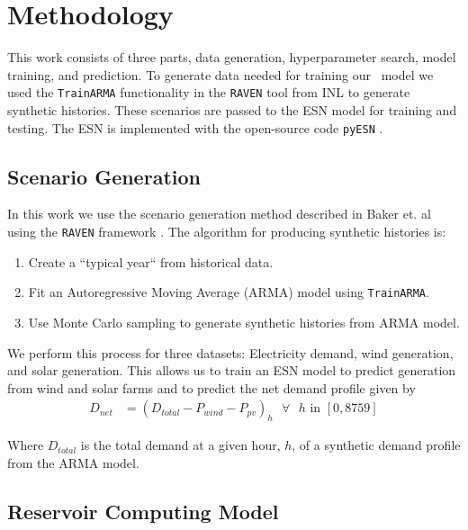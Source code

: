 \section{Methodology}

This work consists of three parts, data generation, hyperparameter search,
model training, and prediction. To generate
data needed for training our \ model we used the \texttt{TrainARMA}
functionality
in the \texttt{RAVEN} tool from INL to generate synthetic histories. These
scenarios are passed to the \acrshort{ESN} model for training and testing.
The \acrshort{ESN} is implemented with the open-source code \texttt{pyESN}
\cite{korndorfer_pyesn_2015}.
\subsection{Scenario Generation}
In this work we use the scenario generation method described in Baker et. al
using the \texttt{RAVEN} framework \cite{baker_optimal_2018}. The algorithm for
producing synthetic histories is:
\begin{enumerate}
	\item Create a ``typical year`` from historical data.
	\item Fit an Autoregressive Moving Average (ARMA) model using
	\texttt{TrainARMA}.
	\item Use Monte Carlo sampling to generate synthetic histories from ARMA
	 model.
\end{enumerate}

We perform this process for three datasets: Electricity demand, wind generation,
and solar generation. This allows us to train an \acrshort{ESN} model to
predict generation
from wind and solar farms and to predict the net demand profile given by
\begin{equation}
	\label{eqn:net-demand}
	\begin{split}
		D_{net} & = (D_{total} - P_{wind} - P_{pv})_h \text{ $\forall$ $h$ in }
		[0,8759]
	\end{split}
\end{equation}

Where $D_{total}$ is the total demand at a given hour, $h$, of a synthetic
demand profile from the
ARMA model.

\subsection{Reservoir Computing Model}

